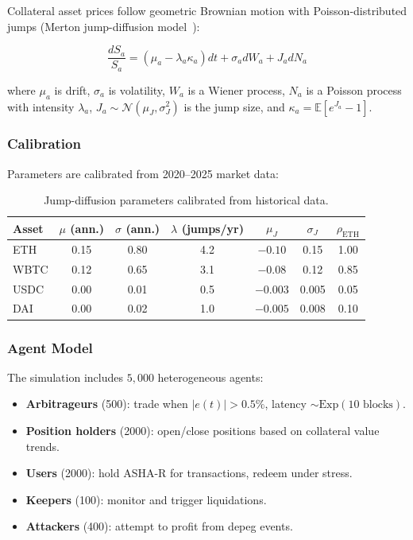 \documentclass[11pt,a4paper]{article}
\newcommand{\ashares}{\textsc{ASHA-R}\xspace}
\newcommand{\EE}{\mathbb{E}}
\begin{document}
Collateral asset prices follow geometric Brownian motion with Poisson-distributed jumps (Merton jump-diffusion model~\citep{merton1976}):

\begin{equation}
  \frac{dS_a}{S_a} = (\mu_a - \lambda_a \kappa_a) dt + \sigma_a dW_a + J_a dN_a
  \label{eq:jump_diffusion}
\end{equation}

where $\mu_a$ is drift, $\sigma_a$ is volatility, $W_a$ is a Wiener process, $N_a$ is a Poisson process with intensity $\lambda_a$, $J_a \sim \mathcal{N}(\mu_J, \sigma_J^2)$ is the jump size, and $\kappa_a = \EE[e^{J_a} - 1]$.

\subsubsection{Calibration}

Parameters are calibrated from 2020--2025 market data:

\begin{table}[H]
\centering
\caption{Jump-diffusion parameters calibrated from historical data.}
\label{tab:jd_params}
\begin{tabular}{@{}lcccccc@{}}
\toprule
\textbf{Asset} & $\mu$ (ann.) & $\sigma$ (ann.) & $\lambda$ (jumps/yr) & $\mu_J$ & $\sigma_J$ & $\rho_{\text{ETH}}$ \\
\midrule
ETH  & 0.15 & 0.80 & 4.2 & $-0.10$ & 0.15 & 1.00 \\
WBTC & 0.12 & 0.65 & 3.1 & $-0.08$ & 0.12 & 0.85 \\
USDC & 0.00 & 0.01 & 0.5 & $-0.003$ & 0.005 & 0.05 \\
DAI  & 0.00 & 0.02 & 1.0 & $-0.005$ & 0.008 & 0.10 \\
\bottomrule
\end{tabular}
\end{table}

\subsubsection{Agent Model}

The simulation includes $5{,}000$ heterogeneous agents:

\begin{itemize}
  \item \textbf{Arbitrageurs} (500): trade when $|e(t)| > 0.5\%$, latency $\sim \text{Exp}(10\text{ blocks})$.
  \item \textbf{Position holders} (2000): open/close positions based on collateral value trends.
  \item \textbf{Users} (2000): hold \ashares for transactions, redeem under stress.
  \item \textbf{Keepers} (100): monitor and trigger liquidations.
  \item \textbf{Attackers} (400): attempt to profit from depeg events.
\end{itemize}
\end{document}

